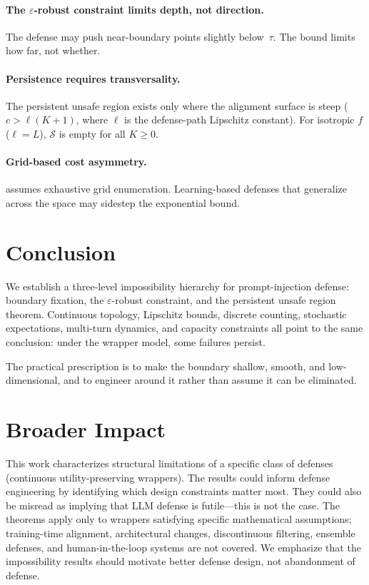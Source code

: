 \documentclass{article}
\begin{document}
\paragraph{The $\varepsilon$-robust constraint limits depth, not direction.}
The defense may push near-boundary points slightly below~$\tau$. The
bound limits how far, not whether.

\paragraph{Persistence requires transversality.}
The persistent unsafe region exists only where the alignment surface
is steep ($c > \ell(K+1)$, where $\ell$ is the defense-path
Lipschitz constant). For isotropic $f$ ($\ell = L$), $\mathcal{S}$
is empty for all $K \geq 0$.

\paragraph{Grid-based cost asymmetry.}
 assumes exhaustive grid enumeration. Learning-based
defenses that generalize across the space may sidestep the exponential
bound.


\section{Conclusion}
\label{sec:conclusion}

We establish a three-level impossibility hierarchy for prompt-injection
defense: boundary fixation, the $\varepsilon$-robust constraint, and the
persistent unsafe region theorem. Continuous topology, Lipschitz bounds,
discrete counting, stochastic expectations, multi-turn dynamics, and
capacity constraints all point to the same conclusion: under the
wrapper model, some failures persist. 

The practical prescription is to make the boundary shallow, smooth,
and low-dimensional, and to engineer around it rather than assume it
can be eliminated.

\section*{Broader Impact}
This work characterizes structural limitations of a specific class
of defenses (continuous utility-preserving wrappers). The results
could inform defense engineering by identifying which design
constraints matter most. They could also be misread as implying
that LLM defense is futile---this is not the case. The theorems
apply only to wrappers satisfying specific mathematical assumptions;
training-time alignment, architectural changes, discontinuous
filtering, ensemble defenses, and human-in-the-loop systems are
not covered. We emphasize that the impossibility results should
motivate better defense design, not abandonment of defense.
\end{document}
